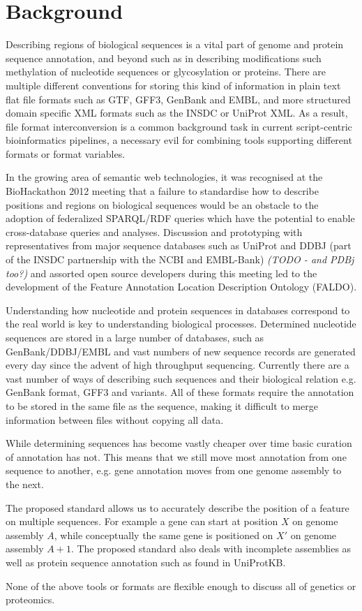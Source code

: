 \section*{Background}
Describing regions of biological sequences is a vital part of genome and protein sequence
annotation, and beyond such as in describing modifications such methylation of nucleotide
sequences or glycosylation or proteins.
There are multiple different conventions for storing this kind of information in
plain text flat file formats such as GTF, GFF3, GenBank and EMBL,
and more structured domain specific XML formats such as the INSDC or UniProt XML.
As a result, file format interconversion is a common background task in current script-centric
bioinformatics pipelines, a necessary evil for combining tools supporting different formats or
format variables.

In the growing area of semantic web technologies, it was recognised at the BioHackathon 2012
meeting \cite{BioHack2011and2012} that a failure to standardise how to describe positions
and regions on biological sequences would be an obstacle to the adoption of federalized
SPARQL/RDF queries which have the potential to enable cross-database queries and
analyses. Discussion and prototyping with representatives from major sequence databases
such as UniProt and DDBJ (part of the INSDC partnership with the NCBI and EMBL-Bank)
\textit{(TODO - and PDBj too?)} and assorted open source developers during this meeting
led to the development of the Feature Annotation Location Description Ontology (FALDO).

Understanding how nucleotide and protein sequences in databases correspond to the real world is key to understanding biological processes.
Determined nucleotide sequences are stored in a large number of databases,
such as GenBank/DDBJ/EMBL and vast numbers of new sequence records are generated every day since the advent of high throughput sequencing.
Currently there are a vast number of ways of describing such sequences and their biological relation e.g. GenBank format, GFF3 and variants.
All of these formats require the annotation to be stored in the same file as the sequence,
making it difficult to merge information between files without copying all data.

While determining sequences has become vastly cheaper over time basic curation of annotation has not.
This means that we still move most annotation from one sequence to another,
e.g. gene annotation moves from one genome assembly to the next.

The proposed standard allows us to accurately describe the position of a feature on multiple sequences.
For example a gene can start at position $X$ on genome assembly $A$,
while conceptually the same gene is positioned on $X'$ on genome assembly $A+1$.
The proposed standard also deals with incomplete assemblies as well as protein sequence annotation such as found in UniProtKB.

None of the above tools or formats are flexible enough to discuss all of genetics or proteomics. 

